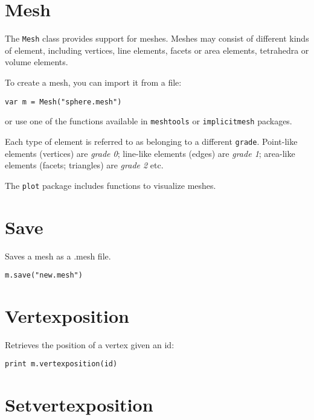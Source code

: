 \hypertarget{mesh}{%
\section{Mesh}\label{mesh}}

The \texttt{Mesh} class provides support for meshes. Meshes may consist
of different kinds of element, including vertices, line elements, facets
or area elements, tetrahedra or volume elements.

To create a mesh, you can import it from a file:

\begin{lstlisting}
var m = Mesh("sphere.mesh")
\end{lstlisting}

or use one of the functions available in \texttt{meshtools} or
\texttt{implicitmesh} packages.

Each type of element is referred to as belonging to a different
\texttt{grade}. Point-like elements (vertices) are \emph{grade 0};
line-like elements (edges) are \emph{grade 1}; area-like elements
(facets; triangles) are \emph{grade 2} etc.

The \texttt{plot} package includes functions to visualize meshes.

\hypertarget{save}{%
\section{Save}\label{save}}

Saves a mesh as a .mesh file.

\begin{lstlisting}
m.save("new.mesh")
\end{lstlisting}

\hypertarget{vertexposition}{%
\section{Vertexposition}\label{vertexposition}}

Retrieves the position of a vertex given an id:

\begin{lstlisting}
print m.vertexposition(id)
\end{lstlisting}

\hypertarget{setvertexposition}{%
\section{Setvertexposition}\label{setvertexposition}}


